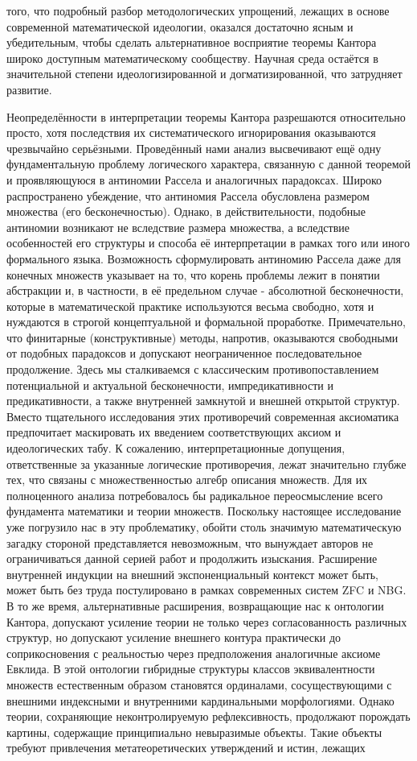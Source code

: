 \documentclass[12pt]{article}
\begin{document}
того, что подробный разбор методологических упрощений, лежащих в основе современной математической идеологии, оказался достаточно ясным и убедительным, чтобы сделать альтернативное восприятие теоремы Кантора широко доступным математическому сообществу. Научная среда остаётся в значительной степени идеологизированной и догматизированной, что затрудняет развитие.

Неопределённости в интерпретации теоремы Кантора разрешаются относительно просто, хотя последствия их систематического игнорирования оказываются чрезвычайно серьёзными. Проведённый нами анализ высвечивают ещё одну фундаментальную проблему логического характера, связанную с данной теоремой и проявляющуюся в антиномии Рассела и аналогичных парадоксах. Широко распространено убеждение, что антиномия Рассела обусловлена размером множества (его бесконечностью). Однако, в действительности, подобные антиномии возникают не вследствие размера множества, а вследствие особенностей его структуры и способа её интерпретации в рамках того или иного формального языка. Возможность сформулировать антиномию Рассела даже для конечных множеств указывает на то, что корень проблемы лежит в понятии абстракции и, в частности, в её предельном случае - абсолютной бесконечности, которые в математической практике используются весьма свободно, хотя и нуждаются в строгой концептуальной и формальной проработке. Примечательно, что финитарные (конструктивные) методы, напротив, оказываются свободными от подобных парадоксов и допускают неограниченное последовательное продолжение. Здесь мы сталкиваемся с классическим противопоставлением потенциальной и актуальной бесконечности, импредикативности и предикативности, а также внутренней замкнутой и внешней открытой структур. Вместо тщательного исследования этих противоречий современная аксиоматика предпочитает маскировать их введением соответствующих аксиом и идеологических табу. К сожалению, интерпретационные допущения, ответственные за указанные логические противоречия, лежат значительно глубже тех, что связаны с множественностью алгебр описания множеств. Для их полноценного анализа потребовалось бы радикальное переосмысление всего фундамента математики и теории множеств. Поскольку настоящее исследование уже погрузило нас в эту проблематику, обойти столь значимую математическую загадку стороной представляется невозможным, что вынуждает авторов не ограничиваться данной серией работ и продолжить изыскания. Расширение внутренней индукции на внешний экспоненциальный контекст может быть, может быть без труда постулировано в рамках современных систем ZFC и NBG. В то же время, альтернативные расширения, возвращающие нас к онтологии Кантора, допускают усиление теории не только через согласованность различных структур, но допускают усиление внешнего контура практически до соприкосновения с реальностью через предположения аналогичные аксиоме Евклида. В этой онтологии гибридные структуры классов эквивалентности множеств естественным образом становятся ординалами, сосуществующими с внешними индексными и внутренними кардинальными морфологиями. Однако теории, сохраняющие неконтролируемую рефлексивность, продолжают порождать картины, содержащие принципиально невыразимые объекты. Такие объекты требуют привлечения метатеоретических утверждений и истин, лежащих 
\end{document}
